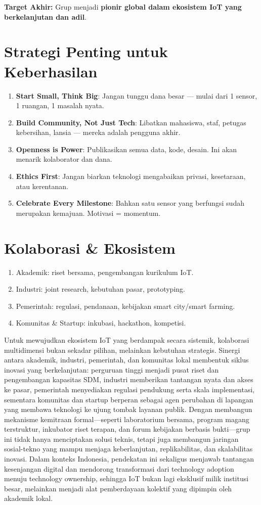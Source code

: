 \documentclass[11pt,a4paper]{article}
\begin{document}
\textbf{Target Akhir:} Grup menjadi \textbf{pionir global dalam ekosistem IoT yang berkelanjutan dan adil}.

\section{Strategi Penting untuk Keberhasilan}

\begin{enumerate}
    \item \textbf{Start Small, Think Big}: Jangan tunggu dana besar — mulai dari 1 sensor, 1 ruangan, 1 masalah nyata.
    \item \textbf{Build Community, Not Just Tech}: Libatkan mahasiswa, staf, petugas kebersihan, lansia — mereka adalah pengguna akhir.
    \item \textbf{Openness is Power}: Publikasikan semua data, kode, desain. Ini akan menarik kolaborator dan dana.
    \item \textbf{Ethics First}: Jangan biarkan teknologi mengabaikan privasi, kesetaraan, atau kerentanan.
    \item \textbf{Celebrate Every Milestone}: Bahkan satu sensor yang berfungsi sudah merupakan kemajuan. Motivasi = momentum.
\end{enumerate}

\section{Kolaborasi \& Ekosistem}
\begin{enumerate}
    \item Akademik: riset bersama, pengembangan kurikulum IoT.
    \item Industri: joint research, kebutuhan pasar, prototyping.
    \item Pemerintah: regulasi, pendanaan, kebijakan smart city/smart farming.
    \item Komunitas \& Startup: inkubasi, hackathon, kompetisi.
\end{enumerate}
Untuk mewujudkan ekosistem IoT yang berdampak secara sistemik, kolaborasi multidimensi bukan sekadar pilihan, melainkan kebutuhan strategis. Sinergi antara akademik, industri, pemerintah, dan komunitas lokal membentuk siklus inovasi yang berkelanjutan: perguruan tinggi menjadi pusat riset dan pengembangan kapasitas SDM, industri memberikan tantangan nyata dan akses ke pasar, pemerintah menyediakan regulasi pendukung serta skala implementasi, sementara komunitas dan startup berperan sebagai agen perubahan di lapangan yang membawa teknologi ke ujung tombak layanan publik. Dengan membangun mekanisme kemitraan formal—seperti laboratorium bersama, program magang terstruktur, inkubator riset terapan, dan forum kebijakan berbasis bukti—grup ini tidak hanya menciptakan solusi teknis, tetapi juga membangun jaringan sosial-tekno yang mampu menjaga keberlanjutan, replikabilitas, dan skalabilitas inovasi. Dalam konteks Indonesia, pendekatan ini sekaligus menjawab tantangan kesenjangan digital dan mendorong transformasi dari technology adoption menuju technology ownership, sehingga IoT bukan lagi eksklusif milik institusi besar, melainkan menjadi alat pemberdayaan kolektif yang dipimpin oleh akademik lokal.
\end{document}
